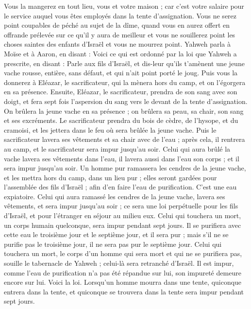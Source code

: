 \begin{multicols}{2}
Vous la mangerez en tout lieu, vous et votre maison ; car c’est votre salaire pour le service auquel vous êtes employés dans la tente d’assignation.
Vous ne serez point coupables de péché au sujet de la dîme, quand vous en aurez offert en offrande prélevée sur ce qu’il y aura de meilleur et vous ne souillerez point les choses saintes des enfants d’Israël et vous ne mourrez point.
\VerseOne{}Yahweh parla à Moïse et à Aaron, en disant :
Voici ce qui est ordonné par la loi que Yahweh a prescrite, en disant : Parle aux fils d'Israël, et dis-leur qu'ils t'amènent une jeune vache rousse, entière, sans défaut, et qui n'ait point porté le joug.
Puis vous la donnerez à Eléazar, le sacrificateur, qui la mènera hors du camp, et on l'égorgera en sa présence.
Ensuite, Eléazar, le sacrificateur, prendra de son sang avec son doigt, et fera sept fois l’aspersion du sang vers le devant de la tente d'assignation.
On brûlera la jeune vache en sa présence ; on brûlera sa peau, sa chair, son sang et ses excréments.
Le sacrificateur prendra du bois de cèdre, de l'hysope, et du cramoisi, et les jettera dans le feu où sera brûlée la jeune vache.
Puis le sacrificateur lavera ses vêtements et sa chair avec de l'eau ; après cela, il rentrera au camp, et le sacrificateur sera impur jusqu'au soir.
Celui qui aura brûlé la vache lavera ses vêtements dans l'eau, il lavera aussi dans l'eau son corps ; et il sera impur jusqu'au soir.
Un homme pur ramassera les cendres de la jeune vache, et les mettra hors du camp, dans un lieu pur ; elles seront gardées pour l'assemblée des fils d'Israël ; afin d'en faire l'eau de purification. C’est une eau expiatoire.
Celui qui aura ramassé les cendres de la jeune vache, lavera ses vêtements, et sera impur jusqu'au soir ; ce sera une loi perpétuelle pour les fils d'Israël, et pour l'étranger en séjour au milieu eux.
Celui qui touchera un mort, un corps humain quelconque, sera impur pendant sept jours.
Il se purifiera avec cette eau le troisième jour et le septième jour, et il sera pur ; mais s'il ne se purifie pas le troisième jour, il ne sera pas pur le septième jour.
Celui qui touchera un mort, le corps d’un homme qui sera mort et qui ne se purifiera pas, souille le tabernacle de Yahweh ; celui-là sera retranché d'Israël. Il est impur, comme l'eau de purification n'a pas été répandue sur lui, son impureté demeure encore sur lui.
Voici la loi. Lorsqu’un homme mourra dans une tente, quiconque entrera dans la tente, et quiconque se trouvera dans la tente sera impur pendant sept jours.

\end{multicols}

